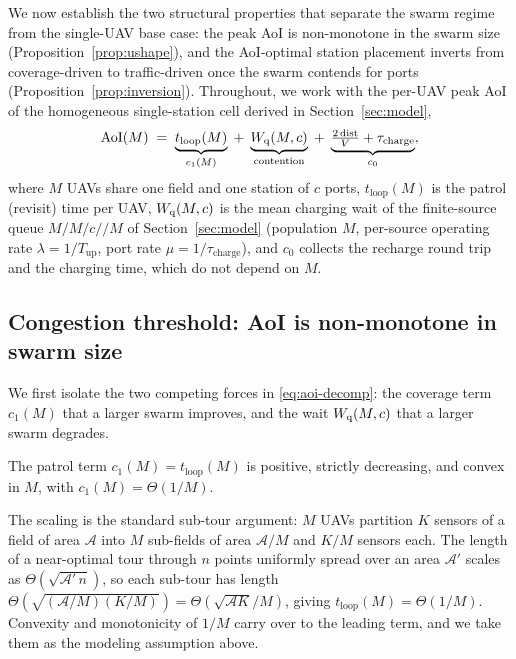 
We now establish the two structural properties that separate the swarm regime
from the single-UAV base case: the peak AoI is non-monotone in the swarm size
(Proposition~\ref{prop:ushape}), and the AoI-optimal station placement inverts
from coverage-driven to traffic-driven once the swarm contends for ports
(Proposition~\ref{prop:inversion}). Throughout, we work with the per-UAV peak
AoI of the homogeneous single-station cell derived in Section~\ref{sec:model},
\begin{equation}
\label{eq:aoi-decomp}
\mathrm{AoI}(M) \;=\; \underbrace{t_{\mathrm{loop}}(M)}_{c_1(M)}
\;+\; \underbrace{W_{\mathrm q}(M,c)}_{\text{contention}}
\;+\; \underbrace{\tfrac{2\,\mathrm{dist}}{V} + \tau_{\mathrm{charge}}}_{c_0},
\end{equation}
where $M$ UAVs share one field and one station of $c$ ports, $t_{\mathrm{loop}}(M)$
is the patrol (revisit) time per UAV, $W_{\mathrm q}(M,c)$ is the mean charging wait of the
finite-source queue $M/M/c//M$ of Section~\ref{sec:model} (population $M$,
per-source operating rate $\lambda=1/T_{\mathrm{up}}$, port rate
$\mu=1/\tau_{\mathrm{charge}}$), and $c_0$ collects the recharge round trip and the
charging time, which do not depend on $M$.

\subsection{Congestion threshold: AoI is non-monotone in swarm size}

We first isolate the two competing forces in \eqref{eq:aoi-decomp}: the coverage
term $c_1(M)$ that a larger swarm improves, and the wait $W_{\mathrm q}(M,c)$ that a larger
swarm degrades.

\begin{assumption}
\label{ass:coverage}
The patrol term $c_1(M)=t_{\mathrm{loop}}(M)$ is positive, strictly decreasing,
and convex in $M$, with $c_1(M)=\Theta(1/M)$.
\end{assumption}

\noindent
The scaling is the standard sub-tour argument: $M$ UAVs partition $K$ sensors of a
field of area $\mathcal{A}$ into $M$ sub-fields of area $\mathcal{A}/M$ and
$K/M$ sensors each. The length of a near-optimal tour through $n$ points uniformly
spread over an area $\mathcal{A}'$ scales as $\Theta(\sqrt{\mathcal{A}'\,n})$, so
each sub-tour has length $\Theta(\sqrt{(\mathcal{A}/M)(K/M)})=\Theta(\sqrt{\mathcal{A}K}/M)$,
giving $t_{\mathrm{loop}}(M)=\Theta(1/M)$. Convexity and monotonicity of $1/M$
carry over to the leading term, and we take them as the modeling assumption above.

